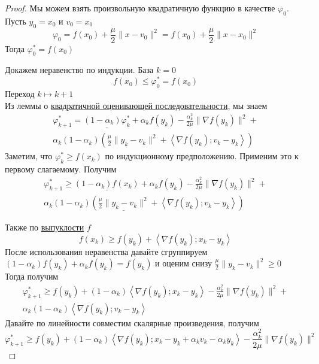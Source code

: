 \begin{proof}
  Мы можем взять произвольную квадратичную функцию в качестве $\varphi_0$.
  Пусть $y_0 = x_0$ и $v_0 = x_0$
  \[
  \varphi_0 = f(x_0) + \frac{\mu}{2} \|x - v_0\|^2 = f(x_0) + \frac{\mu}{2} \|x - x_0\|^2
  \]
  Тогда $\varphi^{*}_0 = f(x_0)$

  Докажем неравенство по индукции.
  База $k=0$
  \[
  f(x_0) \le  \varphi^{*}_0 = f(x_0)
  \]
  Переход $k \mapsto k+1$ \\
  Из леммы о \hyperref[note:4B497C50-C541-428D-94F6-B0F0DF464A50]{квадратичной оценивающей последовательности}, мы знаем
  \begin{multline*}
  \varphi_{k+1}^{*} = \underline{(1-\alpha_{k}) \varphi^{*}_k} + \alpha_k f(y_k) - \frac{\alpha_k^2}{2\mu} \| \nabla f(y_k) \|^2 +\\
  \alpha_k (1-\alpha_k) \left( \frac{\mu}{2} \| y_k -v_k\|^2 + \left\langle \nabla f(y_k); v_k -y_k \right\rangle \right)
  \end{multline*}
  Заметим, что $\varphi^{*}_k \ge f(x_k)$ по индукционному предположению. Применим это к первому слагаемому.
  Получим
  \begin{multline*}
  \varphi_{k+1}^{*} \ge\underline{(1-\alpha_k)f(x_k)} + \alpha_k f(y_k) - \frac{\alpha_k^2}{2\mu} \| \nabla f(y_k) \|^2+\\
   \alpha_k (1-\alpha_k) \left( \underline{\frac{\mu}{2} \| y_k -v_k\|^2} + \left\langle \nabla f(y_k); v_k -y_k \right\rangle \right)
  \end{multline*}

  Также по \hyperref[note:1CA14F2C-637F-41DE-9E97-72075D19E97F]{выпуклости} $f$
  \[
  f(x_k) \ge f(y_k) + \left\langle \nabla f(y_k); x_k - y_k \right\rangle
  \]
  После использования неравенства давайте сгруппируем $(1-\alpha_k) f(y_k) + \alpha_k f(y_k) = f(y_k)$ и оценим снизу $\frac{\mu}{2} \|y_k - v_k\|^2 \ge 0$ \\
  Тогда получим
  \begin{multline*}
  \varphi_{k+1}^{*} \ge f(y_k) + (1-\alpha_k) \left\langle \nabla f(y_k); x_k- y_k \right\rangle - \frac{\alpha_k^2}{2\mu} \| \nabla f(y_k) \|^2+\\
   \alpha_k (1-\alpha_k) \left\langle \nabla f(y_k); v_k -y_k \right\rangle
  \end{multline*}
  Давайте по линейности совместим скалярные произведения, получим
  \[
  \varphi_{k+1}^{*} \ge f(y_k) + (1-\alpha_k) \left\langle \nabla f(y_k); x_k- y_k + \alpha_k v_k - \alpha_k y_k  \right\rangle - \frac{\alpha_k^2}{2\mu} \| \nabla f(y_k) \|^2
  \]


\end{proof}
